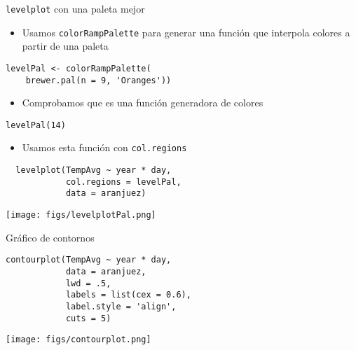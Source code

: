 \documentclass[aspectratio=169, usenames,svgnames,dvipsnames]{beamer}
\begin{document}
\begin{frame}[label={sec:org8c489a5},fragile]{\texttt{levelplot} con una paleta mejor}
 \begin{itemize}
\item Usamos \texttt{colorRampPalette} para generar una función que interpola colores a partir de una paleta
\end{itemize}
\lstset{language=r,label= ,caption= ,captionpos=b,numbers=none}
\begin{lstlisting}
levelPal <- colorRampPalette(
    brewer.pal(n = 9, 'Oranges'))
\end{lstlisting}
\begin{itemize}
\item Comprobamos que es una función generadora de colores
\end{itemize}

\lstset{language=r,label= ,caption= ,captionpos=b,numbers=none}
\begin{lstlisting}
levelPal(14)
\end{lstlisting}

\begin{itemize}
\item Usamos esta función con \texttt{col.regions}
\end{itemize}
\lstset{language=r,label= ,caption= ,captionpos=b,numbers=none}
\begin{lstlisting}
  levelplot(TempAvg ~ year * day,
            col.regions = levelPal,
            data = aranjuez)
\end{lstlisting}
\end{frame}

\begin{frame}[label={sec:org5463c92}]{}
\begin{center}
\texttt{[image: figs/levelplotPal.png]}
\end{center}
\end{frame}

\begin{frame}[label={sec:org0be014f},fragile]{Gráfico de contornos}
 \lstset{language=r,label= ,caption= ,captionpos=b,numbers=none}
\begin{lstlisting}
contourplot(TempAvg ~ year * day,
            data = aranjuez,
            lwd = .5,
            labels = list(cex = 0.6),
            label.style = 'align',
            cuts = 5)
\end{lstlisting}
\end{frame}

\begin{frame}[label={sec:orgb7b5ca2}]{}
\begin{center}
\texttt{[image: figs/contourplot.png]}
\end{center}
\end{frame}
\end{document}
